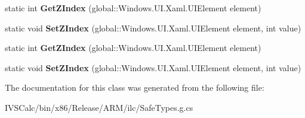 \begin{DoxyCompactItemize}
static int {\bfseries Get\+Z\+Index} (global\+::\+Windows.\+U\+I.\+Xaml.\+U\+I\+Element element)
\item 
\mbox{\label{class_windows_1_1_u_i_1_1_xaml_1_1_controls_1_1_canvas_a05634b687bd468e6302393865f7f4d9c}} 
static void {\bfseries Set\+Z\+Index} (global\+::\+Windows.\+U\+I.\+Xaml.\+U\+I\+Element element, int value)
\item 
\mbox{\label{class_windows_1_1_u_i_1_1_xaml_1_1_controls_1_1_canvas_a1f3123570fbf5432d658782b43c3c313}} 
static int {\bfseries Get\+Z\+Index} (global\+::\+Windows.\+U\+I.\+Xaml.\+U\+I\+Element element)
\item 
\mbox{\label{class_windows_1_1_u_i_1_1_xaml_1_1_controls_1_1_canvas_a05634b687bd468e6302393865f7f4d9c}} 
static void {\bfseries Set\+Z\+Index} (global\+::\+Windows.\+U\+I.\+Xaml.\+U\+I\+Element element, int value)
\end{DoxyCompactItemize}


The documentation for this class was generated from the following file\+:\begin{DoxyCompactItemize}
\item 
I\+V\+S\+Calc/bin/x86/\+Release/\+A\+R\+M/ilc/Safe\+Types.\+g.\+cs\end{DoxyCompactItemize}

